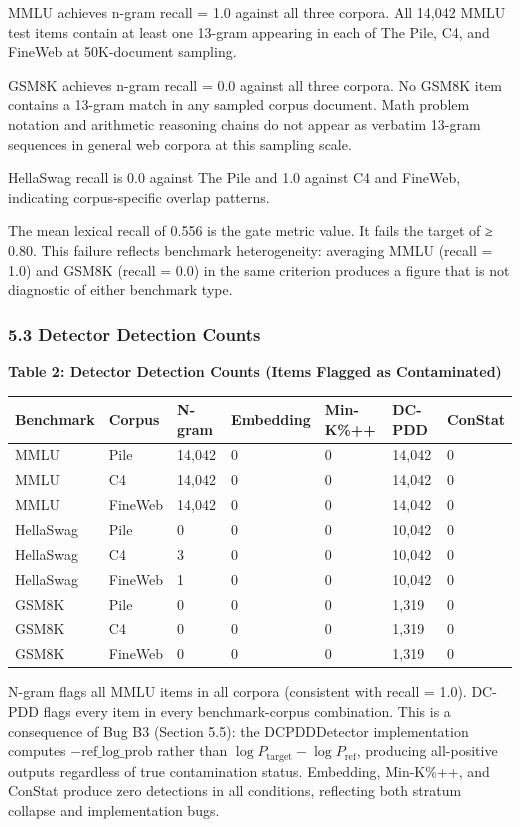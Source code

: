 MMLU achieves n-gram recall = 1.0 against all three corpora. All 14,042 MMLU test items contain at least one 13-gram appearing in each of The Pile, C4, and FineWeb at 50K-document sampling.

GSM8K achieves n-gram recall = 0.0 against all three corpora. No GSM8K item contains a 13-gram match in any sampled corpus document. Math problem notation and arithmetic reasoning chains do not appear as verbatim 13-gram sequences in general web corpora at this sampling scale.

HellaSwag recall is 0.0 against The Pile and 1.0 against C4 and FineWeb, indicating corpus-specific overlap patterns.

The mean lexical recall of 0.556 is the gate metric value. It fails the target of ≥ 0.80. This failure reflects benchmark heterogeneity: averaging MMLU (recall = 1.0) and GSM8K (recall = 0.0) in the same criterion produces a figure that is not diagnostic of either benchmark type.

\subsubsection{5.3 Detector Detection Counts}

\textbf{Table 2: Detector Detection Counts (Items Flagged as Contaminated)}

\begin{table}[htbp]
\centering
\begin{tabular}{lllllll}
\toprule
Benchmark & Corpus & N-gram & Embedding & Min-K\%++ & DC-PDD & ConStat \\
\midrule
MMLU & Pile & 14,042 & 0 & 0 & 14,042 & 0 \\
MMLU & C4 & 14,042 & 0 & 0 & 14,042 & 0 \\
MMLU & FineWeb & 14,042 & 0 & 0 & 14,042 & 0 \\
HellaSwag & Pile & 0 & 0 & 0 & 10,042 & 0 \\
HellaSwag & C4 & 3 & 0 & 0 & 10,042 & 0 \\
HellaSwag & FineWeb & 1 & 0 & 0 & 10,042 & 0 \\
GSM8K & Pile & 0 & 0 & 0 & 1,319 & 0 \\
GSM8K & C4 & 0 & 0 & 0 & 1,319 & 0 \\
GSM8K & FineWeb & 0 & 0 & 0 & 1,319 & 0 \\
\bottomrule
\end{tabular}
\end{table}

N-gram flags all MMLU items in all corpora (consistent with recall = 1.0). DC-PDD flags every item in every benchmark-corpus combination. This is a consequence of Bug B3 (Section 5.5): the DCPDDDetector implementation computes $-\text{ref\_log\_prob}$ rather than $\log P_{\text{target}} - \log P_{\text{ref}}$, producing all-positive outputs regardless of true contamination status. Embedding, Min-K\%++, and ConStat produce zero detections in all conditions, reflecting both stratum collapse and implementation bugs.

